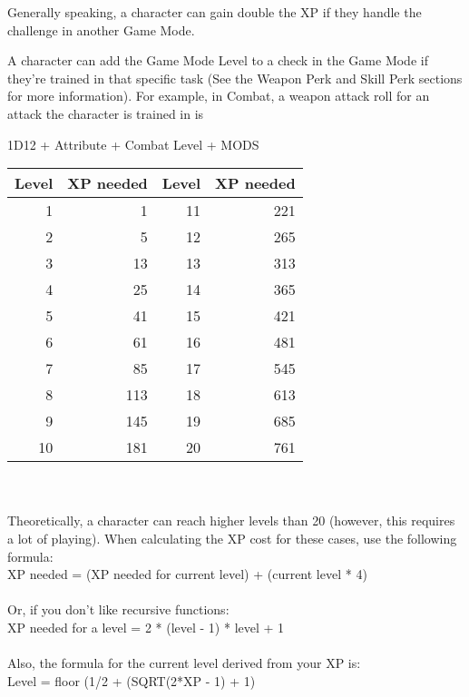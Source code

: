 Generally speaking, a character can gain double the XP if they handle the challenge in another Game Mode.

A character can add the Game Mode Level to a check in the Game Mode if they're trained in that specific task (See the Weapon Perk and Skill Perk sections for more information). For example, in Combat, a weapon attack roll for an attack the character is trained in is \\
\begin{center}
1D12 + Attribute + Combat Level + MODS\\

\begin{tabular}{r r | r r}
Level & XP needed & Level & XP needed\\ \hline
1 & 1 & 11 & 221\\
2 & 5 & 12 & 265\\
3 & 13 & 13 & 313\\
4 & 25 & 14 & 365\\
5 & 41 & 15 & 421\\
6 & 61 & 16 & 481\\
7 & 85 & 17 & 545\\
8 & 113 & 18 & 613\\
9 & 145 & 19 & 685\\
10 & 181 & 20 & 761\\
\end{tabular}\\~\\

Theoretically, a character can reach higher levels than 20 (however, this requires a lot of playing). When calculating the XP cost for these cases, use the following formula:\\

XP needed = (XP needed for current level) + (current level * 4)\\~\\

Or, if you don't like recursive functions:\\
XP needed for a level = 2 * (level - 1) * level + 1\\~\\

Also, the formula for the current level derived from your XP is:\\

Level = floor (1/2 + (SQRT(2*XP - 1)  + 1)\\
\end{center}